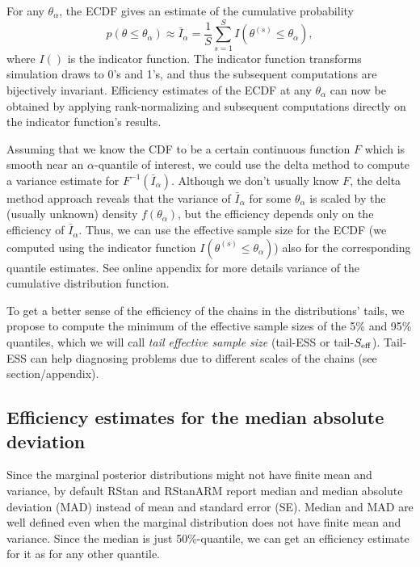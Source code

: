 \documentclass[american,]{article}
\begin{document}
For any \(\theta_\alpha\), the ECDF gives an estimate of the cumulative
probability
\begin{equation}
p(\theta \leq \theta_\alpha) \approx \bar{I}_\alpha = \frac{1}{S}\sum_{s=1}^S
I(\theta^{(s)} \leq\theta_\alpha),
\end{equation}
where \(I()\) is the indicator function. The indicator function
transforms simulation draws to 0's and 1's, and thus the subsequent
computations are bijectively invariant. Efficiency estimates of the ECDF
at any \(\theta_\alpha\) can now be obtained by applying
rank-normalizing and subsequent computations directly on the indicator
function's results.

Assuming that we know the CDF to be a certain continuous function \(F\)
which is smooth near an \(\alpha\)-quantile of interest, we could use
the delta method to compute a variance estimate for
\(F^{-1}(\bar{I}_\alpha)\). Although we don't usually know \(F\), the
delta method approach reveals that the variance of \(\bar{I}_\alpha\)
for some \(\theta_\alpha\) is scaled by the (usually unknown) density
\(f(\theta_\alpha)\), but the efficiency depends only on the efficiency
of \(\bar{I}_\alpha\). Thus, we can use the effective sample size for
the ECDF (we computed using the indicator function
\(I(\theta^{(s)} \leq \theta_\alpha)\)) also for the corresponding
quantile estimates.
%
See online appendix for more details variance of the cumulative
distribution function.

To get a better sense of the efficiency of the chains in the
distributions' tails, we propose to compute the minimum of the effective
sample sizes of the 5\% and 95\% quantiles, which we will call
\emph{tail effective sample size} (tail-ESS or tail-\(S_{\rm eff}\)).
Tail-ESS can help diagnosing problems due to different scales of the
chains (see section/appendix).


\hypertarget{efficiency-estimates-for-the-median-absolute-deviation}{%
\subsection{Efficiency estimates for the median absolute
deviation}\label{efficiency-estimates-for-the-median-absolute-deviation}}

Since the marginal posterior distributions might not have finite mean
and variance, by default RStan \citep{RStan.2.17} and RStanARM
\citep{RStanARM.2.17} report median and median absolute deviation (MAD)
instead of mean and standard error (SE). Median and MAD are well defined
even when the marginal distribution does not have finite mean and
variance. Since the median is just 50\%-quantile, we can get an
efficiency estimate for it as for any other quantile.
\end{document}
